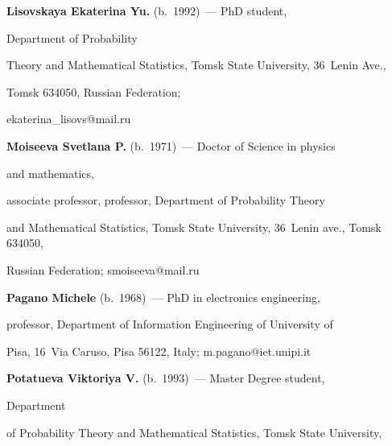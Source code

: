 \Contr





\noindent


\textbf{Lisovskaya Ekaterina Yu.} (b.\ 1992)~--- PhD student,


Department of Probability 


Theory and Mathematical Statistics, Tomsk State University, 36~Lenin Ave., 


Tomsk 634050, Russian Federation; 


\mbox{ekaterina\_lisovs@mail.ru}





\vspace*{3pt}





\noindent


\textbf{Moiseeva Svetlana P.} (b.\ 1971)~--- Doctor of Science in physics 


and mathematics, 


associate professor, professor, Department of Probability Theory


 and Mathematical Statistics, Tomsk State University, 36~Lenin ave., Tomsk 634050, 


 Russian Federation; \mbox{smoiseeva@mail.ru}





\vspace*{3pt}





\noindent


\textbf{Pagano Michele} (b.\ 1968)~--- PhD in electronics engineering,  


professor, Department of Information Engineering of University of 


Pisa, 16~Via Caruso, Pisa 56122, Italy; \mbox{m.pagano@iet.unipi.it}





\vspace*{3pt}





\noindent


\textbf{Potatueva Viktoriya V.} (b.\ 1993)~--- Master Degree student,


Department 


of Probability Theory and Mathematical Statistics, Tomsk State University, 



